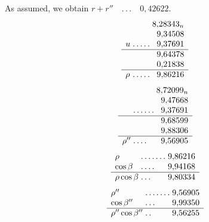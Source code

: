 \noindent As assumed, we obtain \(r+r''\quad\mathord{.}\,\mathord{.}\,\mathord{.}\quad0{,}42622\).
\[
\begin{array}{l@{\;}l@{\;}r}
&&8{,}28343_n\\
&&9{,}34508\\
u&\mathord{.}\,\mathord{.}\,\mathord{.}\,\mathord{.}\,\mathord{.}&9{,}37691\\\hline
&&9{,}64378\\
&&0{,}21838\\\hline
\rho&\mathord{.}\,\mathord{.}\,\mathord{.}\,\mathord{.}\,\mathord{.}&9{,}86216
\end{array}
\]
\[
\begin{array}{l@{\;}l@{\;}r}
&&8{,}72099_n\\
&&9{,}47668\\
&\mathord{.}\,\mathord{.}\,\mathord{.}\,\mathord{.}\,\mathord{.}\,\mathord{.}&9{,}37691\\\hline
&&9{,}68599\\
&&9{,}88306\\\hline
\rho''&\mathord{.}\,\mathord{.}\,\mathord{.}\,\mathord{.}&9{,}56905
\end{array}
\]
\[
\begin{array}{l@{\;}l@{\;}r}
\rho&\mathord{.}\,\mathord{.}\,\mathord{.}\,\mathord{.}\,\mathord{.}\,\mathord{.}\,\mathord{.}&9{,}86216\\
\cos\beta&\mathord{.}\,\mathord{.}\,\mathord{.}\,\mathord{.}&9{,}94168\\\hline
\rho\cos\beta&\mathord{.}\,\mathord{.}\,\mathord{.}&9{,}80334
\end{array}
\]
\[
\begin{array}{l@{\;}l@{\;}r}
\rho''&\mathord{.}\,\mathord{.}\,\mathord{.}\,\mathord{.}\,\mathord{.}\,\mathord{.}\,\mathord{.}&9{,}56905\\
\cos\beta''&\mathord{.}\,\mathord{.}\,\mathord{.}&9{,}99350\\\hline
\rho''\cos\beta''&\mathord{.}\,\mathord{.}&9{,}56255
\end{array}
\]

